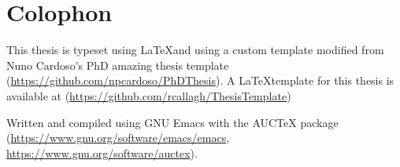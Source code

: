 \chapter*{Colophon}
This thesis is typeset using \LaTeX and  using a custom template modified from Nuno Cardoso's PhD amazing thesis template (\url{https://github.com/npcardoso/PhDThesis}). A \LaTeX template for this thesis is available at (\url{https://github.com/rcallagh/ThesisTemplate})

Written and compiled using GNU Emacs with the AUCTeX package (\url{https://www.gnu.org/software/emacs/emacs}, \url{https://www.gnu.org/software/auctex}).
